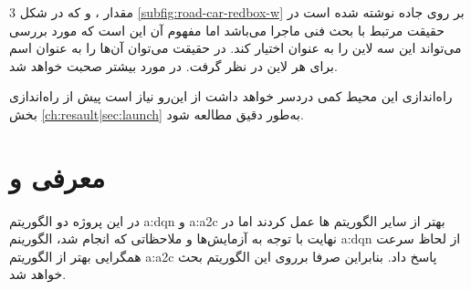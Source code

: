 \begin{figure}[b!]
	\centering
	\caption[]{%
	}
	\label{fig:road-car-total}
\end{figure}

3 مقدار  ،  و  که در شکل \ref{subfig:road-car-redbox-w} بر روی جاده نوشته شده است در حقیقت مرتبط با بحث فنی ماجرا می‌باشد اما مفهوم آن این است که  مورد بررسی می‌تواند این سه لاین را به عنوان  اختیار کند. در حقیقت می‌توان آن‌ها را به عنوان اسم برای هر لاین در نظر گرفت. در مورد  بیشتر صحبت خواهد شد.

\begin{note}
	راه‌اندازی این محیط کمی دردسر خواهد داشت از این‌رو نیاز است پیش از راه‌اندازی بخش \ref{ch:resault|sec:launch} به‌طور دقیق مطالعه شود.
\end{note}





\section{معرفی  و }
در این پروژه دو الگوریتم \gls{a:dqn} و \gls{a:a2c} بهتر از سایر الگوریتم ها عمل کردند اما در نهایت با توجه به آزمایش‌ها و ملاحظاتی که انجام شد، الگورینم \gls{a:dqn} از لحاظ سرعت همگرایی بهتر از الگوریتم \gls{a:a2c} پاسخ داد. بنابراین صرفا برروی این الگوریتم بحث خواهد شد.




